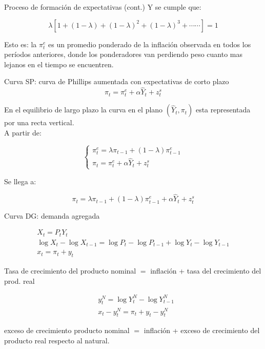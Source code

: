 \documentclass[11pt]{beamer}
\begin{document}
 \begin{frame}{Proceso de formación de expectativas (cont.)}
     Y se cumple que:
			
			$$
			\lambda\left[1+(1-\lambda)+(1-\lambda)^{2}+(1-\lambda)^{3}+\cdots \cdots\right]=1
			$$
			
			Esto es: la $\pi_{t}^{e}$ es un promedio ponderado de la inflación observada en todos los períodos anteriores, donde los ponderadores van perdiendo peso cuanto mas lejanos en el tiempo se encuentren.
			
 \end{frame}
			
		
\begin{frame}{Curva SP: curva de Phillips aumentada con expectativas de corto plazo}
	$$
	\pi_{t}=\pi_{t}^{e}+\alpha \widehat{Y}_{t}+z_{t}^{s}
	$$
	
	En el equilibrio de largo plazo la curva en el plano $\left(\widehat{Y}_{t}, \pi_{t}\right)$ esta representada por una recta vertical.\\
	A partir de:
	
	\[
	\left\{\begin{array}{l}
		\pi_{t}^{e}=\lambda \pi_{t-1}+(1-\lambda) \pi_{t-1}^{e}  \tag{1}\\
		\pi_{t}=\pi_{t}^{e}+\alpha \widehat{Y}_{t}+z_{t}^{s}
	\end{array}\right.
	\]
	
	Se llega a:
	
	
	\begin{equation*}
		\pi_{t}=\lambda \pi_{t-1}+(1-\lambda) \pi_{t-1}^{e}+\alpha \widehat{Y}_{t}+z_{t}^{s} \tag{2}
	\end{equation*}
	
\end{frame}
\begin{frame}{Curva DG: demanda agregada}

\begin{gather*}
X_{t}=P_{t} Y_{t} \\
\log X_{t}-\log X_{t-1}=\log P_{t}-\log P_{t-1}+\log Y_{t}-\log Y_{t-1} \\
x_{t}=\pi_{t}+y_{t} \tag{3}
\end{gather*}


Tasa de crecimiento del producto nominal $=$ inflación + tasa del crecimiento del prod. real

$$
\begin{aligned}
& y_{t}^{N}=\log Y_{t}^{N}-\log Y_{t-1}^{N} \\
& x_{t}-y_{t}^{N}=\pi_{t}+y_{t}-y_{t}^{N}
\end{aligned}
$$

exceso de crecimiento producto nominal $=$ inflación + exceso de crecimiento del producto real respecto al natural.
\end{frame}
\end{document}
